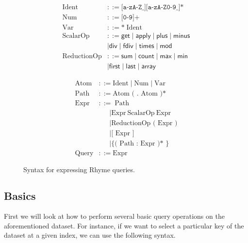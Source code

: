\documentclass[runningheads]{llncs}
\newcommand{\lang}{Rhyme}
\begin{document}
\begin{figure}[t!]
\scriptsize
\begin{minipage}{0.5\textwidth}
\begin{align*}
\text{Ident} &::= \texttt{[a-zA-Z\_][a-zA-Z0-9\_]*} \\
\text{Num} &::= \texttt{[0-9]+} \\ 
\text{Var} &::= \texttt{*}\;\text{Ident} \\
\text{ScalarOp} &::= \textsf{get} \mid \textsf{apply} \mid \textsf{plus} \mid \textsf{minus} \\ 
&\mid \textsf{div} \mid \textsf{fdiv} \mid \textsf{times} \mid \textsf{mod} \\ 
\text{ReductionOp} &::= \textsf{sum} \mid \textsf{count} \mid \textsf{max} \mid \textsf{min} \\ 
&\mid \textsf{first} \mid \textsf{last} \mid \textsf{array}
\end{align*}
\end{minipage}%
\begin{minipage}{0.5\textwidth}
\begin{align*}
\text{Atom} &::= \text{Ident} \mid \text{Num} \mid \text{Var} \\
\text{Path} &::= \text{Atom ( . Atom )*} \\
\text{Expr} &::= \;\text{Path} \\
&\quad\;\; \mid \text{Expr} \ \text{ScalarOp} \ \text{Expr} \\
&\quad\;\; \mid \text{ReductionOp ( Expr )} \\
&\quad\;\; \mid \text{[ Expr ]} \\
&\quad\;\; \mid \text{\{ ( Path : Expr )* \}} \\
\text{Query} &::= \text{Expr}
\end{align*}
\end{minipage}

\caption{Syntax for expressing \lang{} queries.}\label{fig:grammar}
\vspace{-5mm}
\end{figure}

\vspace{-4mm}
\subsection{Basics}
\vspace{-2mm}
First we will look at how to perform several basic query operations on the
aforementioned dataset.
For instance, if we want to select a particular key of the dataset at a given
index, we can use the following syntax.
\end{document}
